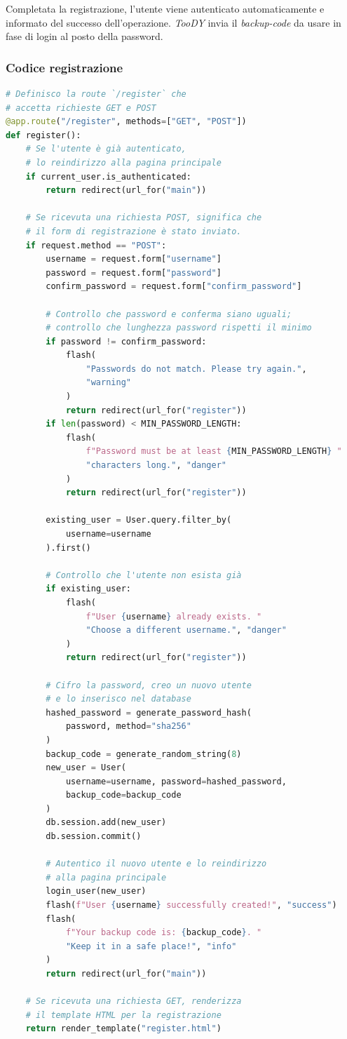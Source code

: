 \documentclass[12pt]{report}
\newcommand{\toody}{\textsl{TooDY}\xspace}
\begin{document}
Completata la registrazione, l'utente viene autenticato automaticamente e informato del successo dell'operazione. \toody invia il \textit{backup-code} da usare in fase di login al posto della password.

\subsubsection{Codice registrazione}
\begin{lstlisting}[language=Python]
# Definisco la route `/register` che
# accetta richieste GET e POST
@app.route("/register", methods=["GET", "POST"])
def register():
    # Se l'utente è già autenticato,
    # lo reindirizzo alla pagina principale
    if current_user.is_authenticated:
        return redirect(url_for("main"))

    # Se ricevuta una richiesta POST, significa che
    # il form di registrazione è stato inviato.
    if request.method == "POST":
        username = request.form["username"]
        password = request.form["password"]
        confirm_password = request.form["confirm_password"]

        # Controllo che password e conferma siano uguali;
        # controllo che lunghezza password rispetti il minimo
        if password != confirm_password:
            flash(
                "Passwords do not match. Please try again.",
                "warning"
            )
            return redirect(url_for("register"))
        if len(password) < MIN_PASSWORD_LENGTH:
            flash(
                f"Password must be at least {MIN_PASSWORD_LENGTH} "
                "characters long.", "danger"
            )
            return redirect(url_for("register"))

        existing_user = User.query.filter_by(
            username=username
        ).first()

        # Controllo che l'utente non esista già
        if existing_user:
            flash(
                f"User {username} already exists. "
                "Choose a different username.", "danger"
            )
            return redirect(url_for("register"))

        # Cifro la password, creo un nuovo utente
        # e lo inserisco nel database
        hashed_password = generate_password_hash(
            password, method="sha256"
        )
        backup_code = generate_random_string(8)
        new_user = User(
            username=username, password=hashed_password,
            backup_code=backup_code
        )
        db.session.add(new_user)
        db.session.commit()

        # Autentico il nuovo utente e lo reindirizzo
        # alla pagina principale
        login_user(new_user)
        flash(f"User {username} successfully created!", "success")
        flash(
            f"Your backup code is: {backup_code}. "
            "Keep it in a safe place!", "info"
        )
        return redirect(url_for("main"))

    # Se ricevuta una richiesta GET, renderizza
    # il template HTML per la registrazione
    return render_template("register.html")
\end{lstlisting}
\end{document}
